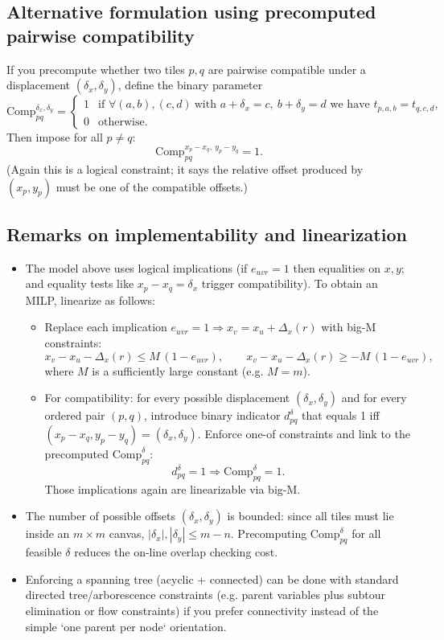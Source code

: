 \documentclass{article}
\begin{document}
\subsection*{Alternative formulation using precomputed pairwise compatibility}
If you precompute whether two tiles \(p,q\) are pairwise compatible under a displacement \((\delta_x,\delta_y)\), define the binary parameter
\[
\mathrm{Comp}_{pq}^{\delta_x,\delta_y}=\begin{cases}
1 &\text{if } \forall (a,b),(c,d)\ \text{with } a+\delta_x=c,\ b+\delta_y=d \text{ we have } t_{p,a,b}=t_{q,c,d},\\
0 &\text{otherwise.}
\end{cases}
\]
Then impose for all \(p\ne q\):
\[
\mathrm{Comp}_{pq}^{x_p-x_q,\ y_p-y_q} = 1.
\]
(Again this is a logical constraint; it says the relative offset produced by \((x_p,y_p)\) must be one of the compatible offsets.)

\subsection*{Remarks on implementability and linearization}
\begin{itemize}
  \item The model above uses logical implications (if \(e_{uvr}=1\) then equalities on \(x,y\); and equality tests like \(x_p-x_q=\delta_x\) trigger compatibility). To obtain an MILP, linearize as follows:
    \begin{itemize}
      \item Replace each implication \(e_{uvr}=1 \Rightarrow x_v = x_u + \Delta_x(r)\) with big-M constraints:
      \[
      x_v - x_u - \Delta_x(r) \le M\,(1-e_{uvr}),\qquad
      x_v - x_u - \Delta_x(r) \ge -M\,(1-e_{uvr}),
      \]
      where \(M\) is a sufficiently large constant (e.g. \(M = m\)).
      \item For compatibility: for every possible displacement \((\delta_x,\delta_y)\) and for every ordered pair \((p,q)\), introduce binary indicator \(d_{pq}^{\delta}\) that equals 1 iff \((x_p-x_q,y_p-y_q)=(\delta_x,\delta_y)\). Enforce one-of constraints and link to the precomputed \(\mathrm{Comp}_{pq}^{\delta}\):
      \[
      d_{pq}^{\delta}=1 \Rightarrow \mathrm{Comp}_{pq}^{\delta}=1.
      \]
      Those implications again are linearizable via big-M.
    \end{itemize}
  \item The number of possible offsets \((\delta_x,\delta_y)\) is bounded: since all tiles must lie inside an \(m\times m\) canvas, \(|\delta_x|,|\delta_y|\le m-n\). Precomputing \(\mathrm{Comp}_{pq}^{\delta}\) for all feasible \(\delta\) reduces the on-line overlap checking cost.
  \item Enforcing a spanning tree (acyclic + connected) can be done with standard directed tree/arborescence constraints (e.g. parent variables plus subtour elimination or flow constraints) if you prefer connectivity instead of the simple `one parent per node` orientation.
\end{itemize}
\end{document}
